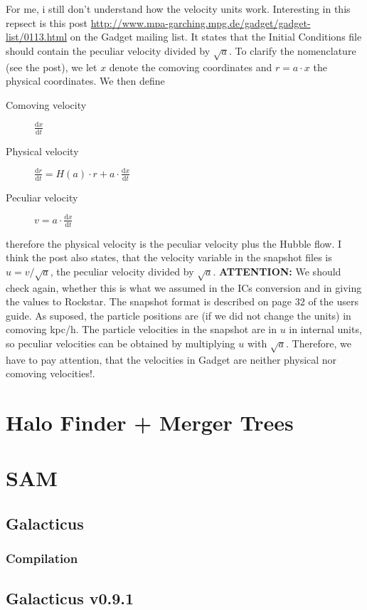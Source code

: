 \documentclass[a4paper,english,10.5pt]{scrartcl}
\begin{document}
For me, i still don't understand how the velocity units work. Interesting in this repsect is this post \url{http://www.mpa-garching.mpg.de/gadget/gadget-list/0113.html} on the Gadget mailing list. It states that the Initial Conditions file should contain the peculiar velocity divided by $\sqrt{a}$. To clarify the nomenclature (see the post), we let $x$ denote the comoving coordinates and $r=a\cdot x$ the physical coordinates. We then define
\begin{description}
 \item[Comoving velocity] $\frac{\textrm{d}x}{\textrm{d}t}$
  \item[Physical velocity] $\frac{\textrm{d}r}{\textrm{d}t} = H(a)\cdot r+a\cdot \frac{\textrm{d}x}{\textrm{d}t}$
  \item[Peculiar velocity] $v = a\cdot \frac{\textrm{d}x}{\textrm{d}t}$ 
\end{description}
therefore the physical velocity is the peculiar velocity plus the Hubble flow. I think the post also states, that the velocity variable in the snapshot files is $u=v/\sqrt{a}$, the peculiar velocity divided by $\sqrt{a}$.
\textbf{ATTENTION:} We should check again, whether this is what we assumed in the ICs conversion and in giving the values to Rockstar.
The snapshot format is described on page 32 of the users guide. As suposed, the particle positions are (if we did not change the units) in comoving kpc/h. The particle velocities in the snapshot are in $u$ in internal units, so peculiar velocities can be obtained by multiplying $u$ with $\sqrt{a}$. Therefore, we have to pay attention, that the velocities in Gadget are neither physical nor comoving velocities!.


\section{Halo Finder + Merger Trees}

\section{SAM}
\subsection{Galacticus}
\subsubsection{Compilation}


\subsection{Galacticus v0.9.1}
\end{document}
